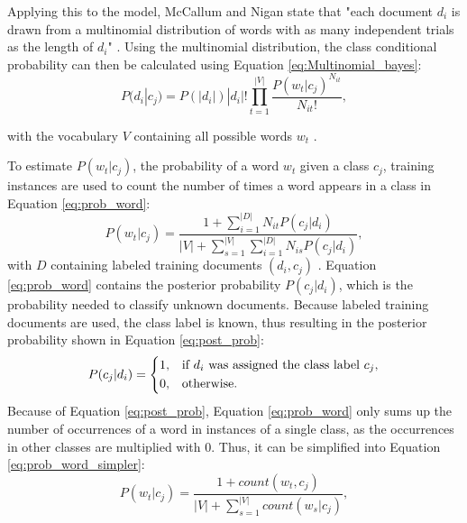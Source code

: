         Applying this to the model, McCallum and Nigan state that "each document $d_i$ is drawn from a multinomial distribution of words with as many independent trials as the length of $d_i$" \cite[p.~3]{Mccallum1998}. Using the multinomial distribution, the class conditional probability can then be calculated using Equation \eqref{eq:Multinomial_bayes}:
        \begin{equation}
            \label{eq:Multinomial_bayes}
                P(d_i|c_j) = P(|d_i|)|d_i|!\prod_{t=1}^{|V|}\frac{P(w_t|c_j)^{N_{it}}}{N_{it}!},
        \end{equation}
        
        with the vocabulary $V$ containing all possible words $w_t$ \cite{Mccallum1998}. 
        
        To estimate $P(w_t|c_j)$, the probability of a word $w_t$ given a class $c_j$, training instances are used to count the number of times a word appears in a class in Equation \eqref{eq:prob_word}:
        \begin{equation}
            \label{eq:prob_word}
                P(w_t|c_j) = \frac{1 + \sum_{i=1}^{|D|}N_{it} P(c_j|d_i)}{|V| + \sum_{s=1}^{|V|} \sum_{i=1}^{|D|}N_{is} P (c_j|d_i)}, 
        \end{equation}
        with $D$ containing labeled training documents $(d_i,c_j)$ \cite{Mccallum1998}.
        Equation \eqref{eq:prob_word} contains the posterior probability $P(c_j|d_i)$, which is the probability needed to classify unknown documents. Because labeled training documents are used, the class label is known, thus resulting in the posterior probability shown in Equation \eqref{eq:post_prob}:
        \begin{equation}
                \label{eq:post_prob}
                P(c_j|d_i)= 
                \begin{dcases}
                1,& \text{if } d_i \text{ was assigned the class label } c_j, \\
                0,              & \text{otherwise.}
        \end{dcases}
        \end{equation}
        Because of Equation \eqref{eq:post_prob}, Equation \eqref{eq:prob_word} only sums up the number of occurrences of a word in instances of a single class, as the occurrences in other classes are multiplied with 0. Thus, it can be simplified into Equation \eqref{eq:prob_word_simpler}:
                \begin{equation}
            \label{eq:prob_word_simpler}
                P(w_t|c_j) = \frac{1 + count(w_t, c_j)}{|V| + \sum_{s=1}^{|V|}count(w_s|c_j)}, 
        \end{equation}

